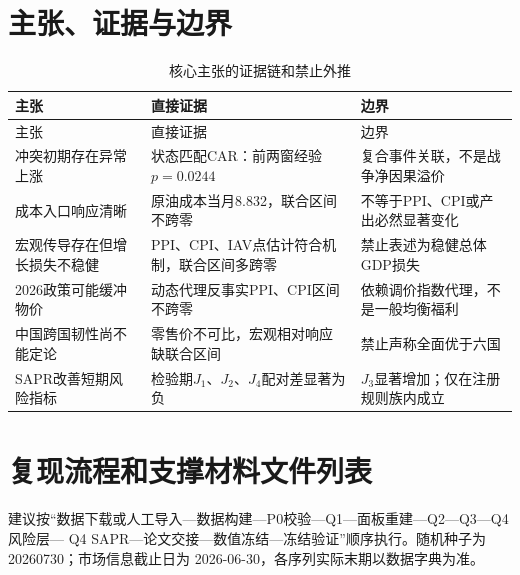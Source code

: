 \clearpage
\begin{appendices}

\section{主张、证据与边界}

\begin{longtable}{p{}p{}p{}}
  \caption{核心主张的证据链和禁止外推}\label{tab:claim-evidence}\\
  \toprule
  主张 & 直接证据 & 边界 \\
  \midrule
  \endfirsthead
  \toprule
  主张 & 直接证据 & 边界 \\
  \midrule
  \endhead
  冲突初期存在异常上涨 & 状态匹配CAR：前两窗经验$p=0.0244$ & 复合事件关联，不是战争净因果溢价 \\
  成本入口响应清晰 & 原油成本当月8.832，联合区间不跨零 & 不等于PPI、CPI或产出必然显著变化 \\
  宏观传导存在但增长损失不稳健 & PPI、CPI、IAV点估计符合机制，联合区间多跨零 & 禁止表述为稳健总体GDP损失 \\
  2026政策可能缓冲物价 & 动态代理反事实PPI、CPI区间不跨零 & 依赖调价指数代理，不是一般均衡福利 \\
  中国跨国韧性尚不能定论 & 零售价不可比，宏观相对响应缺联合区间 & 禁止声称全面优于六国 \\
  SAPR改善短期风险指标 & 检验期$J_1$、$J_2$、$J_4$配对差显著为负 & $J_3$显著增加；仅在注册规则族内成立 \\
  \bottomrule
\end{longtable}

\section{复现流程和支撑材料文件列表}

建议按“数据下载或人工导入---数据构建---P0校验---Q1---面板重建---Q2---Q3---Q4风险层---
Q4 SAPR---论文交接---数值冻结---冻结验证”顺序执行。随机种子为20260730；市场信息截止日为
2026-06-30，各序列实际末期以数据字典为准。


\end{appendices}
